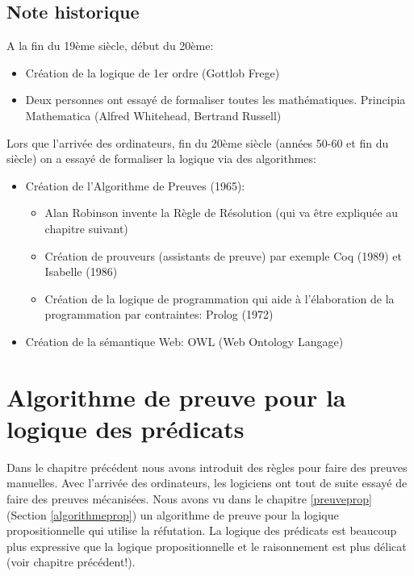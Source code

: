 \section{Note historique}

\hfill {\begin{minipage}{0.90\textwidth}
\begin{small}
A la fin du 19ème siècle, début du 20ème: 
\begin{itemize}
\item Création de la logique de 1er ordre (Gottlob Frege)
\item Deux personnes ont essayé de formaliser toutes les mathématiques. Principia Mathematica (Alfred Whitehead, Bertrand Russell)
\end{itemize}
Lors que l'arrivée des ordinateurs, fin du 20ème siècle (années 50-60 et fin du siècle) on a essayé de formaliser la logique via des algorithmes:
\begin{itemize}
\item Création de l'Algorithme de Preuves (1965):
\begin{itemize}
\item Alan Robinson invente la Règle de Résolution (qui va être expliquée au chapitre suivant)
\item Création de prouveurs (assistants de preuve) par exemple Coq (1989) et Isabelle (1986)
\item Création de la logique de programmation qui aide à l'élaboration de la programmation par contraintes: Prolog (1972) 
\end{itemize}
\item Création de la sémantique Web: OWL (Web Ontology Langage)
\end{itemize}
\end{small}
\end{minipage}

\chapter{Algorithme de preuve pour la logique des prédicats}
\label{algorithmepreuve}

Dans le chapitre précédent nous avons introduit des règles pour faire des preuves manuelles.
Avec l'arrivée des ordinateurs, les logiciens ont tout de suite essayé de faire des preuves mécanisées.
Nous avons vu dans le chapitre \ref{preuveprop} (Section \ref{algorithmeprop})
un algorithme de preuve pour la logique propositionnelle qui utilise la réfutation.
La logique des prédicats est beaucoup plus expressive que la logique propositionnelle
et le raisonnement est plus délicat (voir chapitre précédent!).

}
